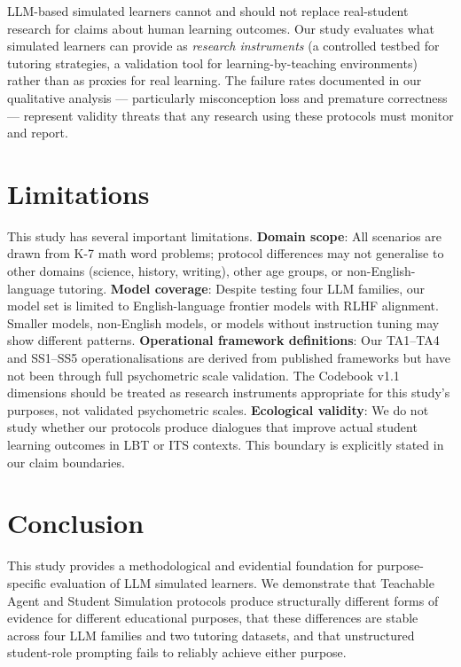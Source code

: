 \documentclass[12pt]{article}
\begin{document}
LLM-based simulated learners cannot and should not replace real-student research for claims
about human learning outcomes. Our study evaluates what simulated learners can provide
as \emph{research instruments} (a controlled testbed for tutoring strategies, a validation
tool for learning-by-teaching environments) rather than as proxies for real learning.
The failure rates documented in our qualitative analysis --- particularly misconception loss
and premature correctness --- represent validity threats that any research using these
protocols must monitor and report.

\section{Limitations}

This study has several important limitations. \textbf{Domain scope}: All scenarios are drawn
from K-7 math word problems; protocol differences may not generalise to other domains
(science, history, writing), other age groups, or non-English-language tutoring.
\textbf{Model coverage}: Despite testing four LLM families, our model set is limited to
English-language frontier models with RLHF alignment. Smaller models, non-English models,
or models without instruction tuning may show different patterns.
\textbf{Operational framework definitions}: Our TA1--TA4 and SS1--SS5 operationalisations
are derived from published frameworks but have not been through full psychometric scale
validation. The Codebook v1.1 dimensions should be treated as research instruments
appropriate for this study's purposes, not validated psychometric scales.
\textbf{Ecological validity}: We do not study whether our protocols produce dialogues that
improve actual student learning outcomes in LBT or ITS contexts. This boundary is explicitly
stated in our claim boundaries.

\section{Conclusion}

This study provides a methodological and evidential foundation for purpose-specific
evaluation of LLM simulated learners. We demonstrate that Teachable Agent and Student
Simulation protocols produce structurally different forms of evidence for different
educational purposes, that these differences are stable across four LLM families and two
tutoring datasets, and that unstructured student-role prompting fails to reliably achieve
either purpose.
\end{document}
